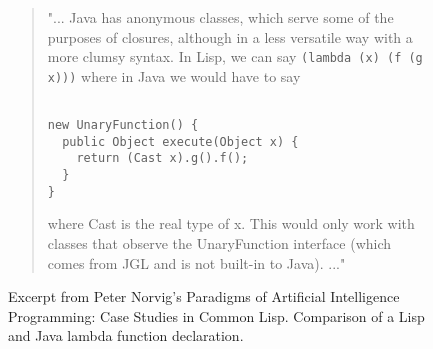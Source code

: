 \begin{figure}[ht]

\begin{quote}
"... Java has anonymous classes, which serve some of the purposes of closures, although in a less versatile way with a more clumsy syntax. In Lisp, we can say \texttt{(lambda (x) (f (g x)))} where in Java we would have to say

\begin{verbatim}

new UnaryFunction() { 
  public Object execute(Object x) {
    return (Cast x).g().f();
  }
}
\end{verbatim}
where Cast is the real type of x. This would only work with classes that observe the UnaryFunction interface (which comes from JGL and is not built-in to Java). ..."
\end{quote}

\caption{Excerpt from Peter Norvig's Paradigms of Artificial Intelligence Programming: Case Studies in Common Lisp. Comparison of a Lisp and Java lambda function declaration.\cite{PAIP.Norvig}}
\label{fig:norvig-lisp-comparison}
\end{figure}
